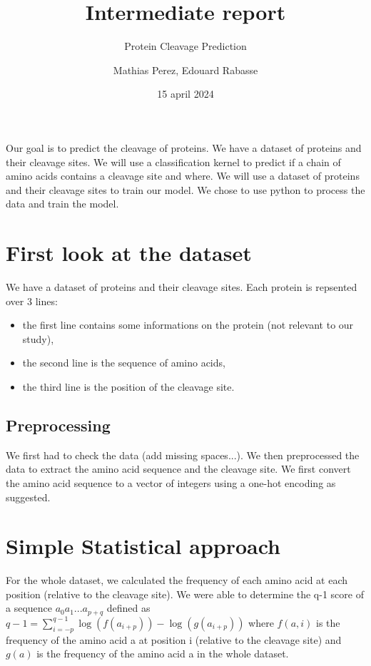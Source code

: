 \documentclass[a4paper,12pt]{report}
\title{Intermediate report}
\subtitle{Protein Cleavage Prediction}
\author{Mathias Perez, Edouard Rabasse}
\date{15 april 2024}
\begin{document}
\maketitle

Our goal is to predict the cleavage of proteins. We have a dataset of proteins and their cleavage sites. 
We will use a classification kernel to predict if a chain of amino acids contains a cleavage site and where. 
We will use a dataset of proteins and their cleavage sites to train our model.
We chose to use python to process the data and train the model.

\section*{First look at the dataset}  
We have a dataset of proteins and their cleavage sites. 
Each protein is repsented over 3 lines: 
\begin{itemize}
    \item the first line contains some informations on the protein (not relevant to our study),
    \item the second line is the sequence of amino acids,
    \item the third line is the position of the cleavage site.
\end{itemize}

\subsection*{Preprocessing}
We first had to check the data (add missing spaces...).
We then preprocessed the data to extract the amino acid sequence and the cleavage site. 
We first convert the amino acid sequence to a vector of integers using a one-hot encoding as suggested.

   

\section*{Simple Statistical approach}
For the whole dataset, we calculated the frequency of each amino acid at each position (relative to the cleavage site).
We were able to determine the q-1 score of a sequence $a_0 a_1 ... a_{p+q}$ defined as 
$q-1 = \sum_{i=-p}^{q-1} \log(f(a_{i+p})) - \log (g(a_{i+p}))$ 
where $f(a,i) $ is the frequency of the amino acid a at position i (relative to the cleavage site)
and $g(a)$ is the frequency of the amino acid a in the whole dataset.
\end{document}
